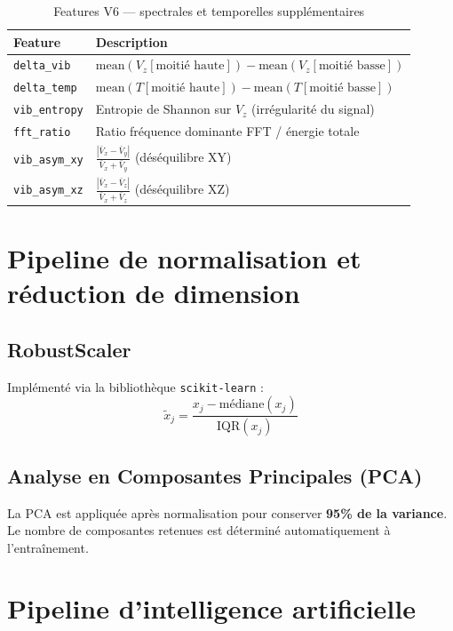 \documentclass[12pt,a4paper]{report}
\begin{document}
\begin{table}[H]
\centering
\caption{Features V6 — spectrales et temporelles supplémentaires}
\label{tab:feat_v6}
\begin{tabular}{ll}
\toprule
\textbf{Feature} & \textbf{Description} \\
\midrule
\texttt{delta\_vib}   & $\text{mean}(V_z[\text{moitié haute}]) - \text{mean}(V_z[\text{moitié basse}])$ \\
\texttt{delta\_temp}  & $\text{mean}(T[\text{moitié haute}]) - \text{mean}(T[\text{moitié basse}])$ \\
\texttt{vib\_entropy} & Entropie de Shannon \cite{shannon1948} sur $V_z$ (irrégularité du signal) \\
\texttt{fft\_ratio}   & Ratio fréquence dominante FFT \cite{cooley1965} / énergie totale \\
\texttt{vib\_asym\_xy} & $\frac{|\bar{V}_x - \bar{V}_y|}{\bar{V}_x + \bar{V}_y}$ (déséquilibre XY) \\
\texttt{vib\_asym\_xz} & $\frac{|\bar{V}_x - \bar{V}_z|}{\bar{V}_x + \bar{V}_z}$ (déséquilibre XZ) \\
\bottomrule
\end{tabular}
\end{table}

\section{Pipeline de normalisation et réduction de dimension}

\subsection{RobustScaler}
Implémenté via la bibliothèque \texttt{scikit-learn} \cite{pedregosa2011} :
\begin{equation}
  \tilde{x}_j = \frac{x_j - \text{médiane}(x_j)}{\text{IQR}(x_j)}
\end{equation}

\subsection{Analyse en Composantes Principales (PCA)}

La PCA \cite{pedregosa2011} est appliquée après normalisation pour conserver \textbf{95\% de
la variance}. Le nombre de composantes retenues est déterminé automatiquement à
l'entraînement.


\section{Pipeline d'intelligence artificielle}
\label{sec:pipeline_ia}
\end{document}

